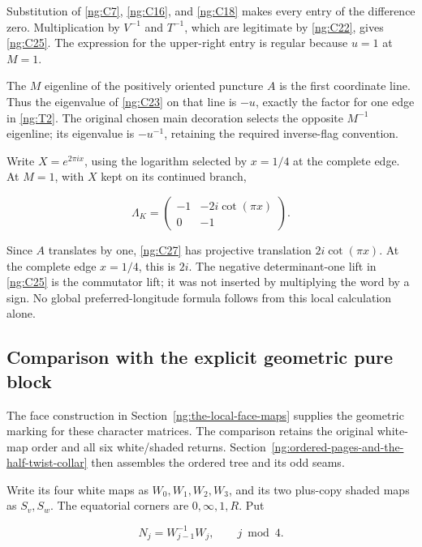 Substitution of \eqref{ng:C7}, \eqref{ng:C16}, and \eqref{ng:C18} makes every entry of the difference zero. Multiplication by \(V^{-1}\) and \(T^{-1}\), which are legitimate by \eqref{ng:C22}, gives \eqref{ng:C25}. The expression for the upper-right entry is regular because \(u=1\) at \(M=1\).

The \(M\) eigenline of the positively oriented puncture \(A\) is the first coordinate line. Thus the eigenvalue of \eqref{ng:C23} on that line is \(-u\), exactly the factor for one edge in \eqref{ng:T2}. The original chosen main decoration selects the opposite \(M^{-1}\) eigenline; its eigenvalue is \(-u^{-1}\), retaining the required inverse-flag convention.

Write \(X=e^{2\pi i x}\), using the logarithm selected by \(x=1/4\)
at the complete edge. At \(M=1\), with \(X\) kept on its continued branch,

\begin{equation}\label{ng:C27}
\Lambda_K=
 \begin{pmatrix}
 -1&-2i\cot(\pi x)\\0&-1
 \end{pmatrix}.
\end{equation}

Since \(A\) translates by one, \eqref{ng:C27} has projective translation
\(2i\cot(\pi x)\). At the complete edge \(x=1/4\), this is \(2i\).
The negative determinant-one lift in \eqref{ng:C25} is the commutator lift; it was not inserted by multiplying the word by a sign. No global preferred-longitude formula follows from this local calculation alone.

\subsection{Comparison with the explicit geometric pure block}\label{ng:comparison-with-the-explicit-native-pure-block}

The face construction in Section~\ref{ng:the-local-face-maps} supplies the geometric marking
for these character matrices. The comparison retains the original
white-map order and all six white/shaded returns. Section~\ref{ng:ordered-pages-and-the-half-twist-collar} then
assembles the ordered tree and its odd seams.

Write its four white maps as \(W_0,W_1,W_2,W_3\), and its two plus-copy shaded maps as \(S_v,S_w\). The equatorial corners are \(0,\infty,1,R\). Put

\begin{equation}\label{ng:C28}
N_j=W_{j-1}^{-1}W_j,\qquad j\bmod4.
\end{equation}

